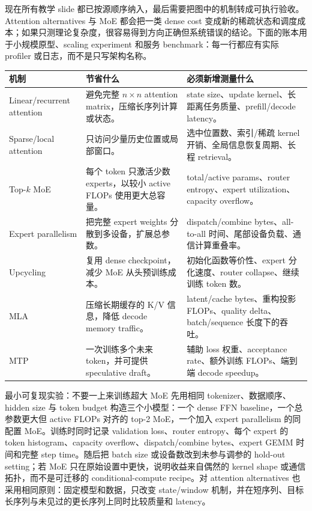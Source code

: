 现在所有教学 slide 都已按源顺序纳入，最后需要把图中的机制转成可执行验收。Attention alternatives 与 MoE 都会把一类 dense cost 变成新的稀疏状态和调度成本；如果只测理论复杂度，很容易得到方向正确但系统错误的结论。下面的账本用于小规模原型、scaling experiment 和服务 benchmark：每一行都应有实际 profiler 或日志，而不是只写架构名称。

\begin{longtable}{p{}p{}p{}}
\toprule
机制 & 节省什么 & 必须新增测量什么 \\
\midrule
Linear/recurrent attention & 避免完整 $n\times n$ attention matrix，压缩长序列计算或状态。 & state size、update kernel、长距离任务质量、prefill/decode latency。 \\
Sparse/local attention & 只访问少量历史位置或局部窗口。 & 选中位置数、索引/稀疏 kernel 开销、全局信息恢复周期、长程 retrieval。 \\
Top-$k$ MoE & 每个 token 只激活少数 experts，以较小 active FLOPs 使用更大总容量。 & total/active params、router entropy、expert utilization、capacity overflow。 \\
Expert parallelism & 把完整 expert weights 分散到多设备，扩展总参数。 & dispatch/combine bytes、all-to-all 时间、尾部设备负载、通信计算重叠率。 \\
Upcycling & 复用 dense checkpoint，减少 MoE 从头预训练成本。 & 初始化函数等价性、expert 分化速度、router collapse、继续训练 token 数。 \\
MLA & 压缩长期缓存的 K/V 信息，降低 decode memory traffic。 & latent/cache bytes、重构投影 FLOPs、quality delta、batch/sequence 长度下的吞吐。 \\
MTP & 一次训练多个未来 token，并可提供 speculative draft。 & 辅助 loss 权重、acceptance rate、额外训练 FLOPs、端到端 decode speedup。 \\
\bottomrule
\end{longtable}

\begin{importantbox}{最小可复现实验：不要一上来训练超大 MoE}
先用相同 tokenizer、数据顺序、hidden size 与 token budget 构造三个小模型：一个 dense FFN baseline，一个总参数更大但 active FLOPs 对齐的 top-2 MoE，一个加入 expert parallelism 的同配置 MoE。训练时同时记录 validation loss、router entropy、每个 expert 的 token histogram、capacity overflow、dispatch/combine bytes、expert GEMM 时间和完整 step time。随后把 batch size 或设备数改到未参与调参的 hold-out setting；若 MoE 只在原始设置中更快，说明收益来自偶然的 kernel shape 或通信拓扑，而不是可迁移的 conditional-compute recipe。对 attention alternatives 也采用相同原则：固定模型和数据，只改变 state/window 机制，并在短序列、目标长序列与未见过的更长序列上同时比较质量和 latency。
\end{importantbox}

